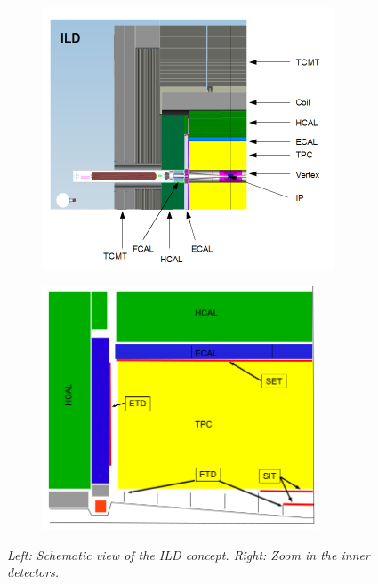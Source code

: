 \begin{figure}
\centering
\begin{subfigure}{0.5\textwidth}
    \includegraphics[width=0.95\textwidth]{graphics/ILD.png}

\end{subfigure}%
  \begin{subfigure}{0.5\textwidth}
\centering
    \includegraphics[width=0.9\textwidth]{graphics/ILDtracking.png}

\end{subfigure}
    \caption{\sl Left: Schematic view of the ILD concept. Right: Zoom in the inner detectors.}
    \label{fig:ILDScheme}
\end{figure}

